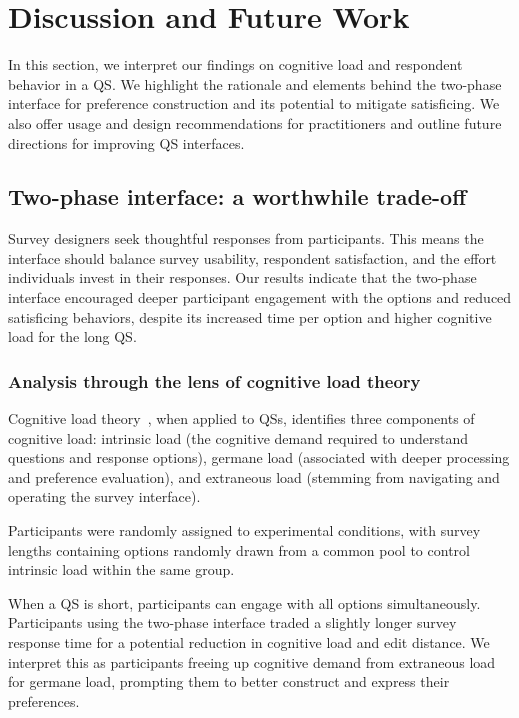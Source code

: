 \section{Discussion and Future Work}
\label{sec:discussion}

In this section, we interpret our findings on cognitive load and respondent behavior in a QS. We highlight the rationale and elements behind the two-phase interface for preference construction and its potential to mitigate satisficing. We also offer usage and design recommendations for practitioners and outline future directions for improving QS interfaces.

\subsection{Two-phase interface: a worthwhile trade-off}
Survey designers seek thoughtful responses from participants. This means the interface should balance survey usability, respondent satisfaction, and the effort individuals invest in their responses. Our results indicate that the two-phase interface encouraged deeper participant engagement with the options and reduced satisficing behaviors, despite its increased time per option and higher cognitive load for the long QS.

\subsubsection{Analysis through the lens of cognitive load theory}
Cognitive load theory~\cite{swellerCognitiveLoadTheory2011}, when applied to QSs, identifies three components of cognitive load: intrinsic load (the cognitive demand required to understand questions and response options), germane load (associated with deeper processing and preference evaluation), and extraneous load (stemming from navigating and operating the survey interface).

Participants were randomly assigned to experimental conditions, with survey lengths containing options randomly drawn from a common pool to control intrinsic load within the same group. 

When a QS is short, participants can engage with all options simultaneously. Participants using the two-phase interface traded a slightly longer survey response time for a potential reduction in cognitive load and edit distance. We interpret this as participants freeing up cognitive demand from extraneous load for germane load, prompting them to better construct and express their preferences.

